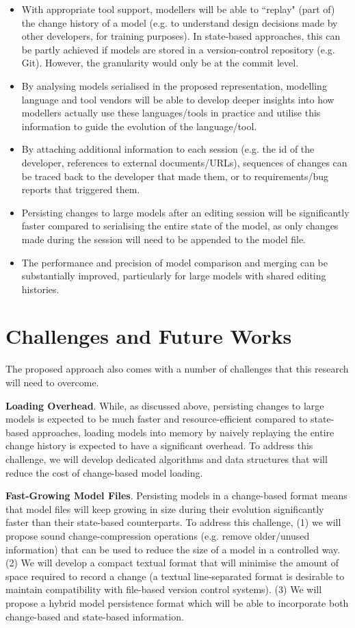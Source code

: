 \documentclass{llncs}
\begin{document}
\begin{itemize}
\item With appropriate tool support, modellers will be able to ``replay" (part of) the change history of a model (e.g. to understand design decisions made by other developers, for training purposes). In state-based approaches, this can be partly achieved if models are stored in a version-control repository (e.g. Git). However, the granularity would only be at the commit level.
\item By analysing models serialised in the proposed representation, modelling language and tool vendors will be able to develop deeper insights into how modellers actually use these languages/tools in practice and utilise this information to guide the evolution of the language/tool.
\item By attaching additional information to each session (e.g. the id of the developer, references to external documents/URLs), sequences of changes can be traced back to the developer that made them, or to requirements/bug reports that triggered them.
\item Persisting changes to large models after an editing session will be significantly faster compared to serialising the entire state of the model, as only changes made during the session will need to be appended to the model file.
\item The performance and precision of model comparison and merging can be substantially improved, particularly for large models with shared editing histories.
\end{itemize}

\section{Challenges and Future Works}
\label{Challenges and Future Works}
The proposed approach also comes with a number of challenges that this research will need to overcome.

\textbf{Loading Overhead}. While, as discussed above, persisting changes to large models is expected to be much faster and resource-efficient compared to state-based approaches, loading models into memory by naively replaying the entire change history is expected to have a significant overhead. To address this challenge, we will develop dedicated algorithms and data structures that will reduce the cost of change-based model loading. 

\textbf{Fast-Growing Model Files}. Persisting models in a change-based format means that model files will keep growing in size during their evolution significantly faster than their state-based counterparts. To address this challenge, (1) we will propose sound change-compression operations (e.g. remove older/unused information) that can be used to reduce the size of a model in a controlled way. (2) We will develop a compact textual format that will minimise the amount of space required to record a change (a textual line-separated format is desirable to maintain compatibility with file-based version control systems). (3) We will propose a hybrid model persistence format which will be able to incorporate both change-based and state-based information. 
\end{document}
